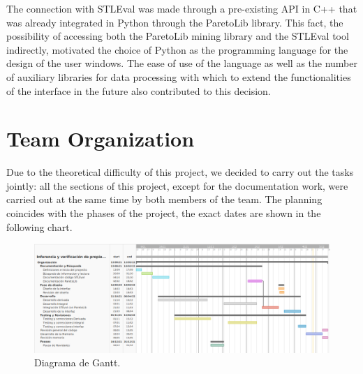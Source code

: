 The connection with STLEval was made through a pre-existing API in C++ that was already integrated in Python through the ParetoLib library. This fact, the possibility of accessing both the ParetoLib mining library and the STLEval tool indirectly, motivated the choice of Python as the programming language for the design of the user windows. The ease of use of the language as well as the number of auxiliary libraries for data processing with which to extend the functionalities of the interface in the future also contributed to this decision.

\section{Team Organization}
Due to the theoretical difficulty of this project, we decided to carry out the tasks jointly: all the sections of this project, except for the documentation work, were carried out at the same time by both members of the team.
The planning coincides with the phases of the project, the exact dates are shown in the following chart.

\begin{figure}
\centering
  \includegraphics[width=.8\linewidth ,angle = 90,scale = 1]{images/gant}
\caption{Diagrama de Gantt.}
\label{fig:gant2}
\end{figure}